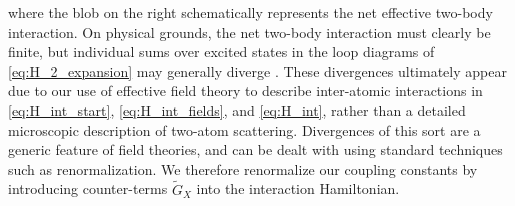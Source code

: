 \documentclass[preprint,showkeys,nofootinbib]{revtex4-1}
\newcommand{\1}{\mathds{1}}
\begin{document}
where the blob on the right schematically represents the net effective
two-body interaction.  On physical grounds, the net two-body
interaction must clearly be finite, but individual sums over excited
states in the loop diagrams of \eqref{eq:H_2_expansion} may generally
diverge \cite{johnson2012effective}.  These divergences ultimately
appear due to our use of effective field theory to describe
inter-atomic interactions in \eqref{eq:H_int_start},
\eqref{eq:H_int_fields}, and \eqref{eq:H_int}, rather than a detailed
microscopic description of two-atom scattering.  Divergences of this
sort are a generic feature of field theories, and can be dealt with
using standard techniques such as renormalization.  We therefore
renormalize our coupling constants by introducing counter-terms
$\tilde G_X$ into the interaction Hamiltonian.
\end{document}
